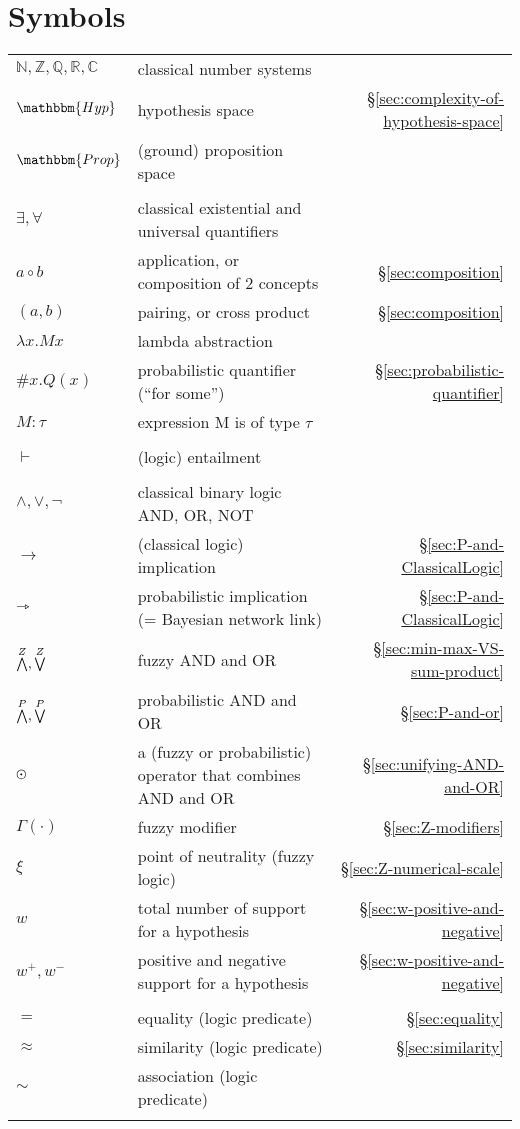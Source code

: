 \chapter*{Symbols}

\begin{tabular*}{0.9\textwidth}{llr}
$\mathbb{N,Z,Q,R,C}$ & classical number systems & \tabularnewline
$\mathbbm{Hyp}$ & hypothesis space & \S\ref{sec:complexity-of-hypothesis-space} \tabularnewline
$\mathbbm{Prop}$ & (ground) proposition space & \tabularnewline
\\

$\exists, \forall$  & classical existential and universal quantifiers & \tabularnewline
$a \circ b$ & application, or composition of 2 concepts& \S\ref{sec:composition} \tabularnewline
$(a, b)$ & pairing, or cross product& \S\ref{sec:composition} \tabularnewline
$\lambda x. M x$ & lambda abstraction & \tabularnewline
$\#x. Q(x)$ & probabilistic quantifier ({}``for some'') & \S\ref{sec:probabilistic-quantifier} \tabularnewline
$M:\tau$ & expression M is of type $\tau$ & \tabularnewline
\\

$\vdash$ & (logic) entailment & \tabularnewline
\\

$\wedge, \vee, \neg$ & classical binary logic AND, OR, NOT & \tabularnewline
$\rightarrow$ & (classical logic) implication & \S\ref{sec:P-and-ClassicalLogic} \tabularnewline
$\rightarrowtriangle$ & probabilistic implication (= Bayesian network link) & \S\ref{sec:P-and-ClassicalLogic} \tabularnewline
$\stackrel{Z}{\bigwedge}, \stackrel{Z}{\bigvee}$ & fuzzy AND and OR & \S\ref{sec:min-max-VS-sum-product} \tabularnewline
$\stackrel{P}{\bigwedge}, \stackrel{P}{\bigvee} $ & probabilistic AND and OR & \S\ref{sec:P-and-or} \tabularnewline
$\varodot$ & a (fuzzy or probabilistic) operator that combines AND and OR & \S\ref{sec:unifying-AND-and-OR} \tabularnewline
$\Gamma(\cdot)$ & fuzzy modifier & \S\ref{sec:Z-modifiers} \tabularnewline
$\xi$ & point of neutrality (fuzzy logic) & \S\ref{sec:Z-numerical-scale} \tabularnewline
$w$ & total number of support for a hypothesis & \S\ref{sec:w-positive-and-negative} \tabularnewline
$w^+, w^-$ & positive and negative support for a hypothesis & \S\ref{sec:w-positive-and-negative} \tabularnewline
\\

$=$ & equality (logic predicate) & \S\ref{sec:equality} \tabularnewline
$\approx$ & similarity (logic predicate) & \S\ref{sec:similarity} \tabularnewline
$\sim$ & association (logic predicate) & \tabularnewline
\\


\end{tabular*}
